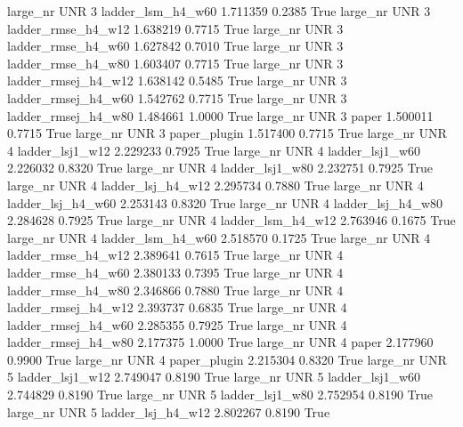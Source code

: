   large_nr      UNR                 3   ladder_lsm_h4_w60    1.711359      0.2385    True
  large_nr      UNR                 3  ladder_rmse_h4_w12    1.638219      0.7715    True
  large_nr      UNR                 3  ladder_rmse_h4_w60    1.627842      0.7010    True
  large_nr      UNR                 3  ladder_rmse_h4_w80    1.603407      0.7715    True
  large_nr      UNR                 3 ladder_rmsej_h4_w12    1.638142      0.5485    True
  large_nr      UNR                 3 ladder_rmsej_h4_w60    1.542762      0.7715    True
  large_nr      UNR                 3 ladder_rmsej_h4_w80    1.484661      1.0000    True
  large_nr      UNR                 3               paper    1.500011      0.7715    True
  large_nr      UNR                 3        paper_plugin    1.517400      0.7715    True
  large_nr      UNR                 4     ladder_lsj1_w12    2.229233      0.7925    True
  large_nr      UNR                 4     ladder_lsj1_w60    2.226032      0.8320    True
  large_nr      UNR                 4     ladder_lsj1_w80    2.232751      0.7925    True
  large_nr      UNR                 4   ladder_lsj_h4_w12    2.295734      0.7880    True
  large_nr      UNR                 4   ladder_lsj_h4_w60    2.253143      0.8320    True
  large_nr      UNR                 4   ladder_lsj_h4_w80    2.284628      0.7925    True
  large_nr      UNR                 4   ladder_lsm_h4_w12    2.763946      0.1675    True
  large_nr      UNR                 4   ladder_lsm_h4_w60    2.518570      0.1725    True
  large_nr      UNR                 4  ladder_rmse_h4_w12    2.389641      0.7615    True
  large_nr      UNR                 4  ladder_rmse_h4_w60    2.380133      0.7395    True
  large_nr      UNR                 4  ladder_rmse_h4_w80    2.346866      0.7880    True
  large_nr      UNR                 4 ladder_rmsej_h4_w12    2.393737      0.6835    True
  large_nr      UNR                 4 ladder_rmsej_h4_w60    2.285355      0.7925    True
  large_nr      UNR                 4 ladder_rmsej_h4_w80    2.177375      1.0000    True
  large_nr      UNR                 4               paper    2.177960      0.9900    True
  large_nr      UNR                 4        paper_plugin    2.215304      0.8320    True
  large_nr      UNR                 5     ladder_lsj1_w12    2.749047      0.8190    True
  large_nr      UNR                 5     ladder_lsj1_w60    2.744829      0.8190    True
  large_nr      UNR                 5     ladder_lsj1_w80    2.752954      0.8190    True
  large_nr      UNR                 5   ladder_lsj_h4_w12    2.802267      0.8190    True
